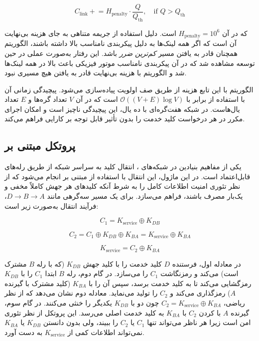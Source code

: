 \begin{equation}
	C_{\text{link}} \mathrel{+}= H_{\text{penalty}} \cdot \frac{Q}{Q_{\text{th}}}, \quad \text{if } Q > Q_{\text{th}}
\end{equation}

که در آن $H_{\text{penalty}} = 10^6$ است. دلیل استفاده از جریمه متناهی به جای هزینه بی‌نهایت آن است که اگر همه لینک‌ها به دلیل پیکربندی نامناسب  بالا داشته باشند، الگوریتم همچنان قادر به یافتن مسیر \emph{کم‌ترین ضرر} باشد. این رفتار به‌صورت عملی در حین توسعه مشاهده شد که در آن پیکربندی نامناسب موتور فیزیکی باعث  بالا در همه لینک‌ها شد و الگوریتم با هزینه بی‌نهایت قادر به یافتن هیچ مسیری نبود.

الگوریتم  با این تابع هزینه از طریق صف اولویت  پیاده‌سازی می‌شود. پیچیدگی زمانی آن با استفاده از  برابر با $\mathcal{O}((V + E) \log V)$ است که در آن $V$ تعداد گره‌ها و $E$ تعداد یال‌هاست. در شبکه هفت‌گره‌ای با ده یال، این پیچیدگی ناچیز است و امکان اجرای مکرر  در هر درخواست کلید خدمت را بدون تأثیر قابل توجه بر کارایی فراهم می‌کند.

\subsection{پروتکل  مبتنی بر }

یکی از مفاهیم بنیادین در شبکه‌های ، انتقال کلید به سراسر شبکه از طریق رله‌های قابل‌اعتماد است. در این ماژول، این انتقال با استفاده از  مبتنی بر  انجام می‌شود که از نظر تئوری امنیت اطلاعات کامل را به شرط آنکه کلیدهای هر جهش کاملاً مخفی و یک‌بار مصرف باشند، فراهم می‌سازد. برای یک مسیر سه‌گرهی مانند $D \to B \to A$، فرآیند انتقال به‌صورت زیر است:

\begin{equation}
	C_1 = K_{\text{service}} \oplus K_{DB}
\end{equation}

\begin{equation}
	C_2 = C_1 \oplus K_{DB} \oplus K_{BA} = K_{\text{service}} \oplus K_{BA}
\end{equation}

\begin{equation}
	K_{\text{service}} = C_2 \oplus K_{BA}
\end{equation}

در معادله اول، فرستنده $D$ کلید خدمت را با کلید جهش $K_{DB}$ (که با رله $B$ مشترک است)  می‌کند و رمزنگاشت $C_1$ را می‌سازد. در گام دوم، رله $B$ ابتدا $C_1$ را با $K_{DB}$ رمزگشایی می‌کند تا به کلید خدمت برسد، سپس آن را با $K_{BA}$ (کلید مشترک با گیرنده $A$) رمزگذاری می‌کند و $C_2$ را تولید می‌نماید. معادله دوم نشان می‌دهد که از نظر ریاضی، $C_2 = K_{\text{service}} \oplus K_{BA}$ چون دو  با $K_{DB}$ یکدیگر را خنثی می‌کنند. در گام سوم، گیرنده $A$ با  کردن $C_2$ با $K_{BA}$ به کلید خدمت اصلی می‌رسد. این پروتکل از نظر تئوری امن است زیرا هر ناظر می‌تواند تنها $C_1$ یا $C_2$ را ببیند، ولی بدون دانستن $K_{DB}$ یا $K_{BA}$ نمی‌تواند اطلاعات کمی از $K_{\text{service}}$ به دست آورد.

